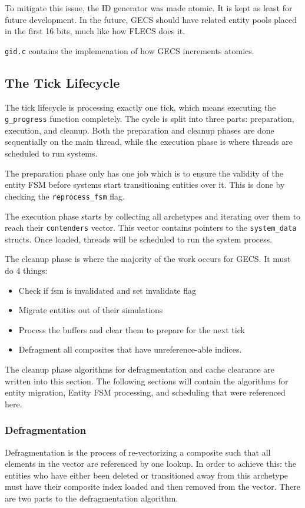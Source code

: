 To mitigate this issue, the ID generator was made atomic. It is kept as least for future development. In the future, GECS should have related entity pools placed in the first 16 bits, much like how FLECS does it.

\texttt{gid.c} contains the implemenation of how GECS increments atomics.

\subsection{The Tick Lifecycle}
The tick lifecycle is processing exactly one tick, which means executing the \texttt{g\_progress} function completely. The cycle is split into three parts: preparation, execution, and cleanup. Both the preparation and cleanup phases are done sequentially on the main thread, while the execution phase is where threads are scheduled to run systems.

The preparation phase only has one job which is to ensure the validity of the entity FSM before systems start transitioning entities over it. This is done by checking the \texttt{reprocess\_fsm} flag.

The execution phase starts by collecting all archetypes and iterating over them to reach their \texttt{contenders} vector. This vector contains pointers to the \texttt{system\_data} structs. Once loaded, threads will be scheduled to run the system process.

The cleanup phase is where the majority of the work occurs for GECS. It must do 4 things:
\begin{itemize}
    \item Check if fsm is invalidated and set invalidate flag
    \item Migrate entities out of their simulations
    \item Process the buffers and clear them to prepare for the next tick
    \item Defragment all composites that have unreference-able indices.
\end{itemize}

The cleanup phase algorithms for defragmentation and cache clearance are written into this section. The following sections will contain the algorithms for entity migration, Entity FSM processing, and scheduling that were referenced here.

\subsubsection{Defragmentation}
Defragmentation is the process of re-vectorizing a composite such that all elements in the vector are referenced by one lookup. In order to achieve this: the entities who have either been deleted or transitioned away from this archetype must have their composite index loaded and then removed from the vector. There are two parts to the defragmentation algorithm.

